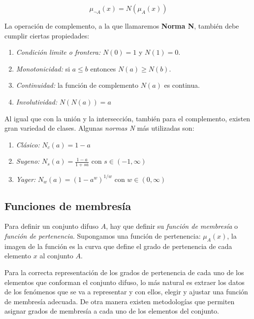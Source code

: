 \begin{displaymath}
	\mu_{\neg A}(x) = N( \mu_A(x) )
\end{displaymath}

La operación de complemento, a la que llamaremos \textbf{Norma N}, también debe cumplir ciertas propiedades:

\begin{enumerate}
	\item \textsl{Condición limite o frontera:} $N(0) = 1$ y $N(1) = 0$.
	\item \textsl{Monotonicidad:} si $a \leq b$ entonces $N(a) \geq N(b)$.
	\item \textsl{Continuidad:} la función de complemento $N(a)$ es continua.
	\item \textsl{Involutividad:} $N(N(a)) = a $
\end{enumerate}

Al igual que con la unión y la intersección, también para el complemento, existen gran variedad de clases.
Algunas \textit{normas N} más utilizadas son:

\begin{enumerate}
	\item \textsl{Clásico:} $N_{c}(a) = 1 - a$
	\item \textsl{Sugeno:} $N_{s}(a) = \frac{1-a}{1+sa}$ con $s \in (-1,\infty)$
	\item \textsl{Yager:} $N_{w}(a) = (1-a^w)^{1/w}$ con $w \in (0, \infty)$
\end{enumerate}



\subsection{Funciones de membresía}\label{cap:membershipfunction}

Para definir un conjunto difuso $A$, hay que definir su \textit{función de membresía} o \textit{función de pertenencia}.
Supongamos una función de pertenencia: $\mu_A(x)$, la imagen de la función es la curva que define el grado de pertenencia de cada elemento $x$ al conjunto $A$.

Para la correcta representación de los grados de pertenencia de cada uno de los elementos que conforman el conjunto difuso, lo más natural es extraer los datos de los fenómenos que se va a representar y con ellos, elegir y ajustar una función de membresía adecuada. De otra manera existen metodologías que permiten asignar grados de membresía a cada uno de los elementos del conjunto.

